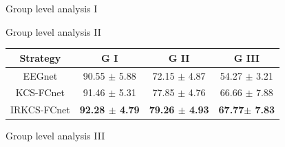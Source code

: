 \documentclass[aspectratio=169]{beamer}
\begin{document}
\begin{frame}{Group level analysis I}
    \centering
    \resizebox{0.7\linewidth}{!}{}
\end{frame}

\begin{frame}{Group level analysis II}
    \begin{table}
        \centering
        \begin{tabular}{|c|c|c|c|}
            \hline
            Strategy & G I & G II  & G III \\
            \hline
            EEGnet & 90.55 $\pm$ 5.88 & 72.15 $\pm$ 4.87 & 54.27 $\pm$ 3.21 \\
            KCS-FCnet & 91.46 $\pm$ 5.31   &  77.85 $\pm$ 4.76 & 66.66 $\pm$ 7.88 \\
            IRKCS-FCnet & \textbf{92.28 $\pm$ 4.79}  & \textbf{79.26 $\pm$ 4.93}  & \textbf{67.77$\pm$ 7.83} \\
            \hline
        \end{tabular}
    \end{table}
\end{frame}

\begin{frame}{Group level analysis III}
  \centering
  \resizebox{0.7\linewidth}{!}{}
\end{frame}
\end{document}

